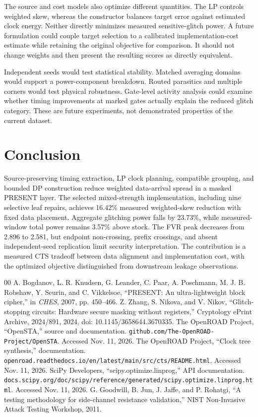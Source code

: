\documentclass[conference]{IEEEtran}
\begin{document}
The source and cost models also optimize different quantities. The LP controls weighted skew, whereas the constructor balances target error against estimated clock energy. Neither directly minimizes measured sensitive-glitch power. A future formulation could couple target selection to a calibrated implementation-cost estimate while retaining the original objective for comparison. It should not change weights and then present the resulting scores as directly equivalent.

Independent seeds would test statistical stability. Matched averaging domains would support a power-component breakdown. Routed parasitics and multiple corners would test physical robustness. Gate-level activity analysis could examine whether timing improvements at marked gates actually explain the reduced glitch category. These are future experiments, not demonstrated properties of the current dataset.

\section{Conclusion}
Source-preserving timing extraction, LP clock planning, compatible grouping, and bounded DP construction reduce weighted data-arrival spread in a masked PRESENT layer. The selected mixed-strength implementation, including nine selective leaf repairs, achieves 16.42\% measured weighted-skew reduction with fixed data placement. Aggregate glitching power falls by 23.73\%, while measured-window total power remains 3.57\% above stock. The FVR peak decreases from 2.896 to 2.581, but endpoint non-crossing, prefix crossings, and absent independent-seed replication limit security interpretation. The contribution is a measured CTS tradeoff between data alignment and implementation cost, with the optimized objective distinguished from downstream leakage observations.

\begin{thebibliography}{00}
 A. Bogdanov, L. R. Knudsen, G. Leander, C. Paar, A. Poschmann, M. J. B. Robshaw, Y. Seurin, and C. Vikkelsoe, ``PRESENT: An ultra-lightweight block cipher,'' in \emph{CHES}, 2007, pp. 450--466.
 Z. Zhang, S. Nikova, and V. Nikov, ``Glitch-stopping circuits: Hardware secure masking without registers,'' Cryptology ePrint Archive, 2024/891, 2024, doi: 10.1145/3658644.3670335.
 The OpenROAD Project, ``OpenSTA,'' source and documentation. \texttt{github.com/\allowbreak The-OpenROAD-Project/\allowbreak OpenSTA}. Accessed Nov. 11, 2026.
 The OpenROAD Project, ``Clock tree synthesis,'' documentation. \texttt{openroad.readthedocs.io/\allowbreak en/\allowbreak latest/\allowbreak main/\allowbreak src/\allowbreak cts/\allowbreak README.html}. Accessed Nov. 11, 2026.
 SciPy Developers, ``scipy.optimize.linprog,'' API documentation. \texttt{docs.scipy.org/\allowbreak doc/\allowbreak scipy/\allowbreak reference/\allowbreak generated/\allowbreak scipy.optimize.linprog.html}. Accessed Nov. 11, 2026.
 G. Goodwill, B. Jun, J. Jaffe, and P. Rohatgi, ``A testing methodology for side-channel resistance validation,'' NIST Non-Invasive Attack Testing Workshop, 2011.
\end{thebibliography}
\end{document}
